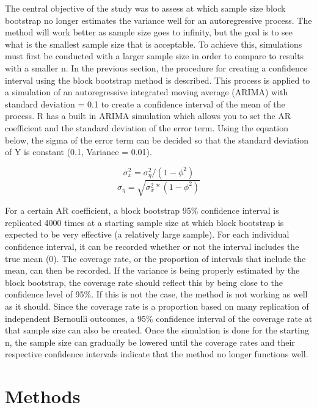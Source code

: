 \documentclass[12pt, letterpaper, titlepage]{article}
\begin{document}
The central objective of the study was to assess at which sample size block bootstrap no longer estimates the variance well for an autoregressive process. The method will work better as sample size goes to infinity, but the goal is to see what is the smallest sample size that is acceptable. To achieve this, simulations must first be conducted with a larger sample size in order to compare to results with a smaller n. In the previous section, the procedure for creating a confidence interval using the block bootstrap method is described. This process is applied to a simulation of an autoregressive integrated moving average (ARIMA) with standard deviation = 0.1 to create a confidence interval of the mean of the process. R has a built in ARIMA simulation which allows you to set the AR coefficient and the standard deviation of the error term. Using the equation below, the sigma of the error term can be decided so that the standard deviation of Y is constant (0.1, Variance = 0.01). 

\[ \sigma_{x}^{2}=\sigma_{\eta}^{2}/\left( 1-\phi^2 \right)\]
\[\sigma_{\eta}=\sqrt{\sigma_{x}^{2}*\left( 1-\phi^2 \right)}\]

For a certain AR coefficient, a block bootstrap 95\% confidence interval is replicated 4000 times at a starting sample size at which block bootstrap is expected to be very effective (a relatively large sample). For each individual confidence interval, it can be recorded whether or not the interval includes the true mean (0). The coverage rate, or the proportion of intervals that include the mean, can then be recorded. If the variance is being properly estimated by the block bootstrap, the coverage rate should reflect this by being close to the confidence level of 95\%. If this is not the case, the method is not working as well as it should. Since the coverage rate is a proportion based on many replication of independent Bernoulli outcomes, a 95\% confidence interval of the coverage rate at that sample size can also be created. Once the simulation is done for the starting n, the sample size can gradually be lowered until the coverage rates and their respective confidence intervals indicate that the method no longer functions well.





\section{Methods}
\label{sec:methods}
\end{document}

